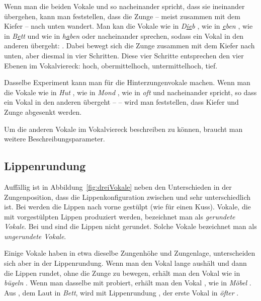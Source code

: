 Wenn man die beiden Vokale \textipa{[i]} und \textipa{[a]} so nacheinander spricht, dass sie ineinander übergehen, kann man feststellen, dass die Zunge -- meist zusammen mit dem Kiefer -- nach unten wandert. Man kan die Vokale \textipa{[i]} wie in \textit{D\underline{ie}b} \textipa{[di:p]}, \textipa{[e]} wie in \textit{\underline{e}ben} \textipa{[\textprimstress Pe:.b@n]}, \textipa{[E]} wie in \textit{B\underline{e}tt} \textipa{[bEt]} und \textipa{[a]} wie in \textit{h\underline{a}ben} \textipa{[\textprimstress ha:.b@n]} oder \textipa{[\textprimstress ha:.b\s{m}]} nacheinander sprechen, sodass ein Vokal in den anderen übergeht: \textipa{[ieEa]}. Dabei bewegt sich die Zunge zusammen mit dem Kiefer nach unten, aber diesmal in vier Schritten. Diese vier Schritte entsprechen den vier Ebenen im Vokalviereck: hoch, obermittelhoch, untermittelhoch, tief.

Dasselbe Experiment kann man für die Hinterzungenvokale machen. Wenn man die Vokale \textipa{[u]} wie in \textit{Hut} \textipa{[hu:t]}, \textipa{[o]} wie in \textit{Mond} \textipa{[mo:nt]}, \textipa{[O]} wie in \textit{oft} \textipa{[POft]} und \textipa{[a]} nacheinander spricht, so dass ein Vokal in den anderen übergeht -- \textipa{[uoOa]} -- wird man feststellen, dass Kiefer und Zunge abgesenkt werden.

Um die anderen Vokale im Vokalviereck beschreiben zu können, braucht man weitere Beschreibungsparameter. 

\subsection{Lippenrundung}
Auffällig ist in Abbildung~\ref{fig:dreiVokale} neben den Unterschieden in der Zungenposition, dass die Lippenkonfiguration zwischen \textipa{[a, i]} und \textipa{[u]} sehr unterschiedlich ist. Bei \textipa{[u]} werden die Lippen nach vorne gestülpt (wie für einen Kuss). Vokale, die mit vorgestülpten Lippen produziert werden, bezeichnet man als \textit{gerundete Vokale}. Bei \textipa{[a]} und \textipa{[i]} sind die Lippen nicht gerundet. Solche Vokale bezeichnet man als \textit{ungerundete Vokale}. 

Einige Vokale haben in etwa dieselbe Zungenhöhe und Zungenlage, unterscheiden sich aber in der Lippenrundung. Wenn man den Vokal \textipa{[i]} lange aushält und dann die Lippen rundet, ohne die Zunge zu bewegen, erhält man den Vokal \textipa{[y]} wie in \textit{bügeln} \textipa{[\textprimstress by:.g@ln]}. Wenn man dasselbe mit \textipa{[e]} probiert, erhält man den Vokal \textipa{[\o]}, wie in \textit{Möbel} \textipa{[\textprimstress m\o :.b@l]}. Aus \textipa{[E]}, dem Laut in \textit{Bett}, wird mit Lippenrundung \textipa{[\oe]}, der erste Vokal in \textit{öfter} \textipa{[\textprimstress P\oe f.t5]}.


